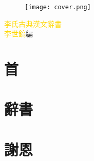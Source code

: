 \documentclass[a5paper,11pt]{report}
\begin{document}
\begin{titlepage}
\doublespacing
\begin{wrapfigure}{r}{50mm}
\texttt{[image: cover.png]}
\end{wrapfigure}
\hfill
\vfill
{
{\huge\textcolor{gold}{李氏古典漢文辭書}}\\
{\textcolor{gold}{李世鎬}\hspace{14pt}編}
}
\vspace{64pt}
\end{titlepage}
\begin{verticaltypesetting}
\newpage
\chapter*{首}
\doublespacing


\chapter*{辭書}
\begin{multicols}{2}
\begin{flushleft}
\onehalfspacing

\end{flushleft}
\end{multicols}

\chapter*{謝恩}
\doublespacing

\end{verticaltypesetting}
\end{document}
